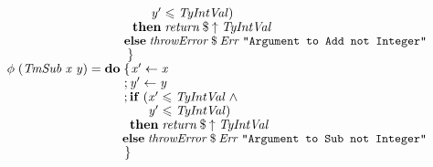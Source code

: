 \documentclass[10pt]{article}
\newcommand{\Conid}[1]{\mathit{#1}}
\newcommand{\Varid}[1]{\mathit{#1}}
\renewcommand{\leq}{\leqslant}
\begin{document}
\begin{tabbing}
${\hskip1.00em\relax\hskip2.00em\relax\phantom{\Varid{\phi}\;(\Conid{TmAdd}\;\Varid{x}\;\Varid{y})\mathrel{=}\mathbf{do}\;\mbox{}}\phantom{;\mathbf{if}\;(\mbox{}}\Varid{y'}\leq \Conid{TyIntVal})}$\\
${\hskip1.00em\relax\hskip2.00em\relax\phantom{\Varid{\phi}\;(\Conid{TmAdd}\;\Varid{x}\;\Varid{y})\mathrel{=}\mathbf{do}\;\mbox{}}\phantom{;\mbox{}}\mathbf{then}\;\Varid{return}\mathbin{\$}\Varid{\uparrow}\;\Conid{TyIntVal}}$\\
${\hskip1.00em\relax\hskip2.00em\relax\phantom{\Varid{\phi}\;(\Conid{TmAdd}\;\Varid{x}\;\Varid{y})\mathrel{=}\mathbf{do}\;\mbox{}}\phantom{;\mbox{}}\mathbf{else}\;\Varid{throwError}\mathbin{\$}\Conid{Err}\;\text{\tt \char34 Argument~to~Add~not~Integer\char34}}$\\
${\hskip1.00em\relax\hskip2.00em\relax\phantom{\Varid{\phi}\;(\Conid{TmAdd}\;\Varid{x}\;\Varid{y})\mathrel{=}\mathbf{do}\;\mbox{}}\mskip1.5mu\}}$\\
${}$\\
${\hskip1.00em\relax\hskip2.00em\relax\Varid{\phi}\;(\Conid{TmSub}\;\Varid{x}\;\Varid{y})\mathrel{=}\mathbf{do}\;\{\mskip1.5mu \Varid{x'}\leftarrow \Varid{x}}$\\
${\hskip1.00em\relax\hskip2.00em\relax\phantom{\Varid{\phi}\;(\Conid{TmSub}\;\Varid{x}\;\Varid{y})\mathrel{=}\mathbf{do}\;\mbox{}};\Varid{y'}\leftarrow \Varid{y}}$\\
${\hskip1.00em\relax\hskip2.00em\relax\phantom{\Varid{\phi}\;(\Conid{TmSub}\;\Varid{x}\;\Varid{y})\mathrel{=}\mathbf{do}\;\mbox{}};\mathbf{if}\;(\Varid{x'}\leq \Conid{TyIntVal}\mathrel{\wedge}}$\\
${\hskip1.00em\relax\hskip2.00em\relax\phantom{\Varid{\phi}\;(\Conid{TmSub}\;\Varid{x}\;\Varid{y})\mathrel{=}\mathbf{do}\;\mbox{}}\phantom{;\mathbf{if}\;(\mbox{}}\Varid{y'}\leq \Conid{TyIntVal})}$\\
${\hskip1.00em\relax\hskip2.00em\relax\phantom{\Varid{\phi}\;(\Conid{TmSub}\;\Varid{x}\;\Varid{y})\mathrel{=}\mathbf{do}\;\mbox{}}\phantom{;\mbox{}}\mathbf{then}\;\Varid{return}\mathbin{\$}\Varid{\uparrow}\;\Conid{TyIntVal}}$\\
${\hskip1.00em\relax\hskip2.00em\relax\phantom{\Varid{\phi}\;(\Conid{TmSub}\;\Varid{x}\;\Varid{y})\mathrel{=}\mathbf{do}\;\mbox{}}\phantom{;\mbox{}}\mathbf{else}\;\Varid{throwError}\mathbin{\$}\Conid{Err}\;\text{\tt \char34 Argument~to~Sub~not~Integer\char34}}$\\
${\hskip1.00em\relax\hskip2.00em\relax\phantom{\Varid{\phi}\;(\Conid{TmSub}\;\Varid{x}\;\Varid{y})\mathrel{=}\mathbf{do}\;\mbox{}}\mskip1.5mu\}}$\\

\end{tabbing}
\end{document}
